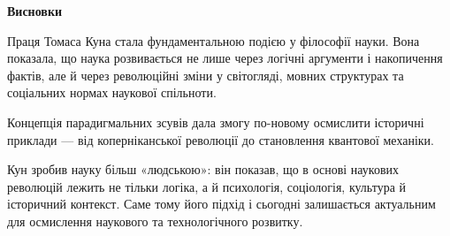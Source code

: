 \documentclass[12pt,a4paper]{article}
\begin{document}
\vspace{1em}

\begin{center}\textbf{\large Висновки}\end{center}

Праця Томаса Куна стала фундаментальною подією у філософії науки. Вона показала, що наука розвивається не лише через логічні аргументи і накопичення фактів, але й через революційні зміни у світогляді, мовних структурах та соціальних нормах наукової спільноти.  

Концепція парадигмальних зсувів дала змогу по-новому осмислити історичні приклади — від коперніканської революції до становлення квантової механіки.  

Кун зробив науку більш «людською»: він показав, що в основі наукових революцій лежить не тільки логіка, а й психологія, соціологія, культура й історичний контекст. Саме тому його підхід і сьогодні залишається актуальним для осмислення наукового та технологічного розвитку.
\end{document}
